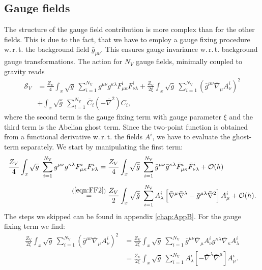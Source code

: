 \subsection{Gauge fields}  
The structure of the gauge field contribution is more complex than for the other fields. This is due to the fact, that we have to employ a gauge fixing procedure w.\,r.\,t. the background field $\bar{g}_{\mu\nu}$. This ensures gauge invariance w.\,r.\,t. background gauge transformations. The action for $N_V$ gauge fields, minimally coupled to gravity reads
\begin{equation}
\begin{aligned}
\mathcal{S}_{V} &= \frac{Z_{\text{V}}}{4}\int_x \sqrt{g} \ \sum\limits_{i=1}^{N_{\text{V}}} g^{\mu\nu}g^{\kappa\lambda}F^{i}_{\mu\kappa}F^{i}_{\nu\lambda}  
		+ \frac{Z_{\text{V}}}{2\xi}\int_x \sqrt{\bar{g}} \ \sum\limits_{i=1}^{N_{\text{V}}} \left(\bar{g}^{\mu\nu}\bar{\nabla}_{\mu}A_{\nu}^{i}\right)^2\\
		&+\int_x \sqrt{\bar{g}} \ \sum\limits_{i=1}^{N_{\text{V}}} \bar{C}_i(-\bar{\nabla}^2)C_i, 
\end{aligned}
\end{equation}
where the second term is the gauge fixing term with gauge parameter $\xi$ and the third term is the Abelian ghost term. Since the two-point function is obtained from a functional derivative w.\,r.\,t. the fields $A^{i}$, we have to evaluate the ghost-term separately. We start by manipulating the first term:
\begin{equation}
\begin{aligned}
\frac{Z_V}{4}\int_x \sqrt{g} \ \sum\limits_{i=1}^{N_{\text{V}}} g^{\mu\nu}g^{\kappa\lambda}F^{i}_{\mu\kappa}F^{i}_{\nu\lambda} =  \frac{Z_{V}}{4} &\int_x \sqrt{\bar{g}} \ \sum\limits_{i=1}^{N_{\text{V}}} \bar{g}^{\mu\nu}\bar{g}^{\kappa\lambda}\bar{F}^{i}_{\mu\kappa}\bar{F}^{i}_{\nu\lambda} + \mathcal{O}(h) \\[5pt]
\overset{(\mathrm{\ref{eqn:FF2}})}{=} \frac{Z_{V}}{2} &\int_x \sqrt{\bar{g}} \ \sum\limits_{i=1}^{N_{\text{V}}} A_{\lambda}^{i}\left[ \bar{\nabla}^{\mu}\bar{\nabla}^{\lambda} - \bar{g}^{\mu\lambda}\bar{\nabla}^2\right]A_{\mu}^{i} + \mathcal{O}(h).
\end{aligned}
\end{equation}
The steps we skipped can be found in appendix \ref{chap:AppB}. For the gauge fixing term we find:
\begin{equation}
\begin{aligned}
\frac{Z_{\text{V}}}{2\xi}\int_x \sqrt{\bar{g}} \ \sum\limits_{i=1}^{N_{\text{V}}} \left(\bar{g}^{\mu\nu}\bar{\nabla}_{\mu}A_{\nu}^{i}\right)^2 
	&= \frac{Z_{\text{V}}}{2\xi}\int_x \sqrt{\bar{g}} \ \sum\limits_{i=1}^{N_{\text{V}}} \bar{g}^{\mu\nu}\bar{\nabla}_{\mu}A_{\nu}^{i}g^{\kappa\lambda}\bar{\nabla}_{\kappa}A_{\lambda}^{i} \\[5pt]
	&= \frac{Z_{\text{V}}}{2\xi}\int_x \sqrt{\bar{g}} \ \sum\limits_{i=1}^{N_{\text{V}}} A_{\lambda}^{i}\left[-\bar{\nabla}^{\lambda}\bar{\nabla}^{\mu}\right]A_{\mu}^{i}. 
\end{aligned}	
\end{equation}

